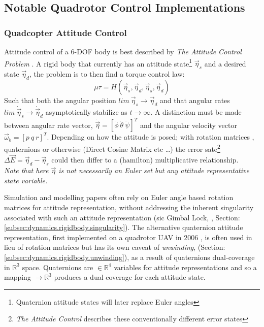 \subsection{Notable Quadrotor Control Implementations}
\label{subsec:intro.lit.control}
\subsubsection*{Quadcopter Attitude Control}
Attitude control of a 6-DOF body is best described by \emph{The Attitude Control Problem} \cite{attitudecontrolproblem}. A rigid body that currently has an attitude state\footnote{Quaternion attitude states will later replace Euler angles} $\vec{\eta}_s$ and a desired state $\vec{\eta}_d$, the problem is to then find a torque control law:
\begin{equation} \label{eq:2}
\mu\tau = H(\vec{\eta}_s,\vec{\eta}_d,\dot{\vec{\eta}}_s,\dot{\vec{\eta}}_d)
\end{equation}
Such that both the angular position $lim~\vec{\eta}_s \rightarrow \vec{\eta}_d$ and that angular rates $lim~\dot{\vec{\eta}}_s \rightarrow \dot{\vec{\eta}}_d$ asymptotically stabilize as $t \rightarrow \infty$. A distinction must be made between angular rate vector, $\dot{\vec{\eta}}=[\dot{\phi}~\dot{\theta}~\dot{\psi}]^T$ and the angular velocity vector $\vec{\omega}_b=[p~q~r]^T$. Depending on how the attitude is posed; with rotation matrices \cite{rigidbodylecture,eulerrigidbody,rotationsequences}, quaternions \cite{quaterniondynamics, rotationsequences, spacecraftattitutdequaternions,fullquaternion} or otherwise (Direct Cosine Matrix etc \ldots) the error sate\footnote{\emph{The Attitude Control} \cite{attitudecontrolproblem} describes these conventionally different error states} $\Delta\vec{E}= \vec{\eta}_d - \vec{\eta}_s$ could then differ to a (hamilton) multiplicative relationship.
\\
\emph{\color{Gray}Note that here $\vec{\eta}$ is not necessarily an Euler set but any attitude representative state variable.}
\par
Simulation and modelling papers often rely on Euler angle based rotation matrices for attitude representation, \cite{adaptivedisturbancecontrol, optimizedpidquadcopter, singleaxistilting, backsteppingquadcoptercontrol, fullquadcoptercontrol} without addressing the inherent singularity associated with such an attitude representation (sic Gimbal Lock, \cite{euleranglesingularity}, Section:\ref{subsec:dynamics.rigidbody.singularity}). The alternative quaternion attitude representation, first implemented on a quadrotor UAV in 2006 \cite{attitudestabilization}, is often used in lieu of rotation matrices but has its own caveat of \emph{unwinding}, (Section:\ref{subsec:dynamics.rigidbody.unwinding}), as a result of quaternions dual-coverage \cite{unwinding} in $\mathbb{R}^3$ space. Quaternions are $\in\mathbb{R}^4$ variables for attitude representations and so a mapping $\rightarrow\mathbb{R}^3$ produces a dual coverage for each attitude state.
